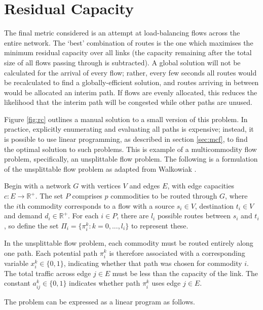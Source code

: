 \section{Residual Capacity}
The final metric considered is an attempt at load-balancing flows across the entire network. The `best' combination of routes is the one which maximises the minimum residual capacity over all links (the capacity remaining after the total size of all flows passing through is subtracted). A global solution will not be calculated for the arrival of every flow; rather, every few seconds all routes would be recalculated to find a globally-efficient solution, and routes arriving in between would be allocated an interim path. If flows are evenly allocated, this reduces the likelihood that the interim path will be congested while other paths are unused.

Figure \ref{fig:rc} outlines a manual solution to a small version of this problem. In practice, explicitly enumerating and evaluating all paths is expensive; instead, it is possible to use linear programming, as described in section \ref{sec:mcf}, to find the optimal solution to such problems. This is example of a multicommodity flow problem, specifically, an unsplittable flow problem. The following is a formulation of the unsplittable flow problem as adapted from Walkowiak \cite{walkowiak:residual}. 

Begin with a network $G$ with vertices $V$ and edges $E$, with edge capacities $c : E \rightarrow \mathbb{R}^+$. The set $P$ comprises $p$ commodities to be routed through $G$, where the $i$th commodity corresponds to a flow with a source $s_i \in V$, destination $t_i \in V$ and demand $d_i \in \mathbb{R}^+$. For each $i \in P$, there are $l_i$ possible routes between $s_i$ and $t_i$, so define the set $\Pi_i = \{\pi_i^k : k = 0, ..., l_i\}$ to represent these.

In the unsplittable flow problem, each commodity must be routed entirely along one path. Each potential path $\pi_i^k$ is therefore associated with a corresponding variable $x_i^k \in \{0,1\}$, indicating whether that path was chosen for commodity $i$. The total traffic across edge $j \in E$ must be less than the capacity of the link. The constant $a_{ij}^k \in \{0,1\}$ indicates whether path $\pi_i^k$ uses edge $j \in E$.

The problem can be expressed as a linear program as follows.

